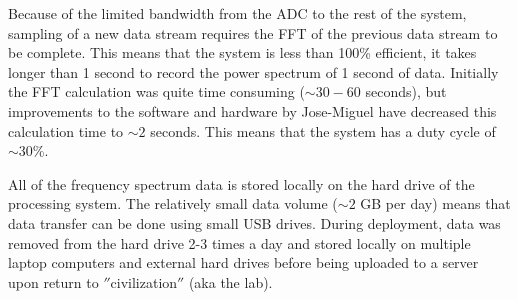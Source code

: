 Because of the limited bandwidth from the ADC to the rest of the system, sampling of a new data stream requires the FFT of the previous data stream to be complete. This means that the system is less than 100\% efficient, it takes longer than 1 second to record the power spectrum of 1 second of data. Initially the FFT calculation was quite time consuming ($\sim 30-60$ seconds), but improvements to the software and hardware by Jose-Miguel have decreased this calculation time to $\sim 2$ seconds. This means that the system has a duty cycle of $\sim30$\%. 

All of the frequency spectrum data is stored locally on the hard drive of the processing system. The relatively small data volume ($\sim 2$ GB per day) means that data transfer can be done using small USB drives. During deployment, data was removed from the hard drive 2-3 times a day and stored locally on multiple laptop computers and external hard drives before being uploaded to a server upon return to $''$civilization$''$ (aka the lab). 

